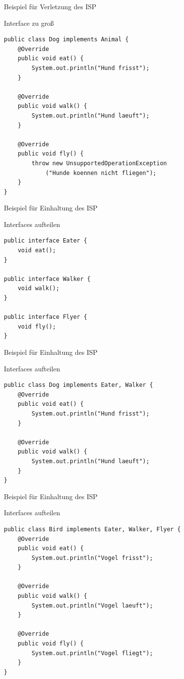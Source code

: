 \begin{frame}[fragile]{Beispiel für Verletzung des ISP}
	\begin{alertblock}{Interface zu groß}
        \begin{lstlisting}
public class Dog implements Animal {
    @Override
    public void eat() {
        System.out.println("Hund frisst");
    }

    @Override
    public void walk() {
        System.out.println("Hund laeuft");
    }

    @Override
    public void fly() {
        throw new UnsupportedOperationException
            ("Hunde koennen nicht fliegen");
    }
}
        \end{lstlisting} 		
 	\end{alertblock}
\end{frame}

\begin{frame}[fragile]{Beispiel für Einhaltung des ISP}
	\begin{exampleblock}{Interfaces aufteilen}
        \begin{lstlisting}
public interface Eater {
    void eat();
}

public interface Walker {
    void walk();
}

public interface Flyer {
    void fly();
}
        \end{lstlisting} 		
 	\end{exampleblock}
\end{frame}

\begin{frame}[fragile]{Beispiel für Einhaltung des ISP}
	\begin{exampleblock}{Interfaces aufteilen}
        \begin{lstlisting}
public class Dog implements Eater, Walker {
    @Override
    public void eat() {
        System.out.println("Hund frisst");
    }

    @Override
    public void walk() {
        System.out.println("Hund laeuft");
    }
}
        \end{lstlisting} 		
 	\end{exampleblock}
\end{frame}

\begin{frame}[fragile]{Beispiel für Einhaltung des ISP}
	\begin{exampleblock}{Interfaces aufteilen}
        \begin{lstlisting}
public class Bird implements Eater, Walker, Flyer {
    @Override
    public void eat() {
        System.out.println("Vogel frisst");
    }

    @Override
    public void walk() {
        System.out.println("Vogel laeuft");
    }

    @Override
    public void fly() {
        System.out.println("Vogel fliegt");
    }
}
        \end{lstlisting} 		
 	\end{exampleblock}
\end{frame}

